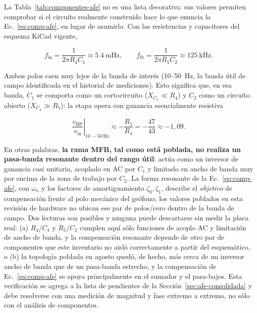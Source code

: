 La Tabla~\ref{tab:componentes-afe} no es una lista decorativa: sus valores permiten
comprobar si el circuito realmente construido hace lo que enuncia la
Ec.~\eqref{eq:comp-afe}, en lugar de asumirlo. Con las resistencias y capacitores del
esquema KiCad vigente,

\begin{equation}
f_{\mathrm{in}}=\frac{1}{2\pi R_4 C_1}\approx\SI{5.4}{\milli\hertz},
\qquad
f_{\mathrm{fb}}=\frac{1}{2\pi R_5 C_2}\approx\SI{125}{\kilo\hertz}.
\label{eq:polos-mfb-reales}
\end{equation}

Ambos polos caen muy lejos de la banda de inter\'es (\SI{10}{}--\SI{50}{\hertz}, la
banda \'util de campo identificada en el historial de mediciones). Esto significa que,
en esa banda, $C_1$ se comporta como un cortocircuito ($X_{C_1}\ll R_4$) y $C_2$ como un
circuito abierto ($X_{C_2}\gg R_5$): la etapa opera con ganancia esencialmente resistiva

\begin{equation}
\left.\frac{v_{\mathrm{BP}}}{v_{\mathrm{in}}}\right|_{\SI{10}{}-\SI{50}{\hertz}}
\approx-\frac{R_5}{R_4}=-\frac{47}{43}\approx-1{,}09.
\label{eq:ganancia-bp-real}
\end{equation}

En otras palabras, \textbf{la rama MFB, tal como est\'a poblada, no realiza un
pasa-banda resonante dentro del rango \'util}: act\'ua como un inversor de ganancia
casi unitaria, acoplado en AC por $C_1$ y limitado en ancho de banda muy por encima de
la zona de trabajo por $C_2$. La forma resonante de la Ec.~\eqref{eq:comp-afe},
con $\omega_n$ y los factores de amortiguamiento $\zeta_0,\zeta_1$, describe el
\emph{objetivo} de compensaci\'on frente al polo mec\'anico del ge\'ofono; los valores
poblados en esta revisi\'on de hardware no ubican ese par de polos/cero dentro de la
banda de campo. Dos lecturas son posibles y ninguna puede descartarse sin medir la
placa real: (a) $R_4/C_1$ y $R_5/C_2$ cumplen aqu\'i s\'olo funciones de acoplo AC y
limitaci\'on de ancho de banda, y la compensaci\'on resonante depende de otro par de
componentes que este inventario no aisl\'o correctamente a partir del esquem\'atico, o
(b) la topolog\'ia poblada en agosto qued\'o, de hecho, m\'as cerca de un inversor
ancho de banda que de un pasa-banda estrecho, y la compensaci\'on de
Ec.~\eqref{eq:comp-afe} se apoya principalmente en el sumador y el pasa-bajos. Esta
verificaci\'on se agrega a la lista de pendientes de la
Secci\'on~\ref{sec:afe-consolidada} y debe resolverse con una medici\'on de magnitud y
fase extremo a extremo, no s\'olo con el an\'alisis de componentes.

